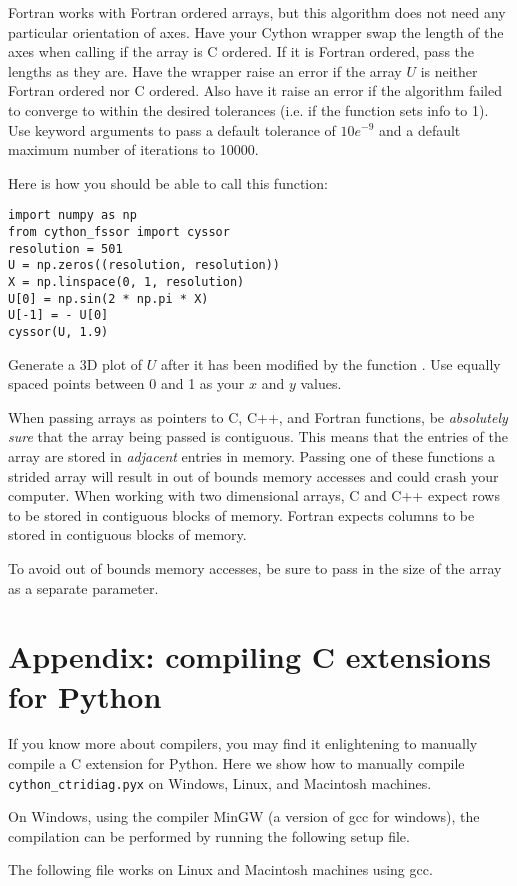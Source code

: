 \begin{problem}
Fortran works with Fortran ordered arrays, but this algorithm does not need any particular orientation of axes.
Have your Cython wrapper swap the length of the axes when calling  if the array is C ordered.
If it is Fortran ordered, pass the lengths as they are.
Have the wrapper raise an error if the array $U$ is neither Fortran ordered nor C ordered.
Also have it raise an error if the algorithm failed to converge to within the desired tolerances (i.e. if the function sets info to 1).
Use keyword arguments to pass  a default tolerance of $10e^{-9}$ and a default maximum number of iterations to 10000.

Here is how you should be able to call this function:
\begin{lstlisting}
import numpy as np
from cython_fssor import cyssor
resolution = 501
U = np.zeros((resolution, resolution))
X = np.linspace(0, 1, resolution)
U[0] = np.sin(2 * np.pi * X)
U[-1] = - U[0]
cyssor(U, 1.9)
\end{lstlisting}

Generate a 3D plot of $U$ after it has been modified by the function .
Use equally spaced points between 0 and 1 as your $x$ and $y$ values.
\end{problem}




\begin{warn}
When passing arrays as pointers to C, C++, and Fortran functions, be \emph{absolutely sure} that the array being passed is contiguous.
This means that the entries of the array are stored in \emph{adjacent} entries in memory.
Passing one of these functions a strided array will result in out of bounds memory accesses and could crash your computer.
When working with two dimensional arrays, C and C++ expect rows to be stored in contiguous blocks of memory.
Fortran expects columns to be stored in contiguous blocks of memory.

To avoid out of bounds memory accesses, be sure to pass in the size of the array as a separate parameter.
\end{warn}

\section*{Appendix: compiling C extensions for Python}
If you know more about compilers, you may find it enlightening to manually compile a C extension for Python.
Here we show how to manually compile \texttt{cython\_ctridiag.pyx} on Windows, Linux, and Macintosh machines.

On Windows, using the compiler MinGW (a version of gcc for windows), the compilation can be performed by running the following setup file.



The following file works on Linux and Macintosh machines using gcc.



